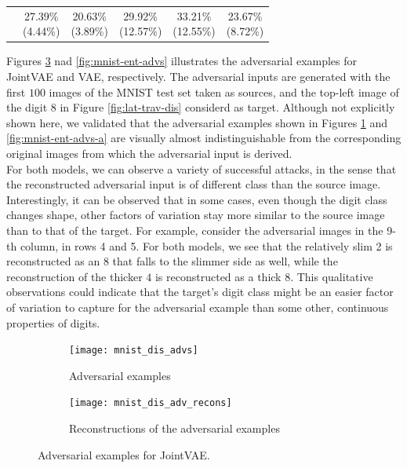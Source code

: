 \documentclass{report}
\begin{document}
\begin{center}
{\begin{tabular}{c|c|c|c|c|c|}
  & \makecell{27.39\% \\ (4.44\%)} & \makecell{20.63\% \\ (3.89\%)} & \makecell{29.92\% \\ (12.57\%)} & \makecell{33.21\% \\ (12.55\%)} & \makecell{23.67\% \\ (8.72\%)} \\ \cline{2-6}
  \end{tabular}
}
\label{tab:adv-atck-target-marg}
\end{center}

\noindent Figures \ref{fig:mnist-dis-advs} nad \ref{fig:mnist-ent-advs} illustrates the adversarial examples for JointVAE and VAE, respectively. The adversarial inputs are generated with the first $100$ images of the MNIST test set taken as sources, and the top-left image of the digit $8$ in Figure \ref{fig:lat-trav-dis} considerd as target. Although not explicitly shown here, we validated that the adversarial examples shown in Figures \ref{fig:mnist-dis-advs-a} and \ref{fig:mnist-ent-advs-a} are visually almost indistinguishable from the corresponding original images from which the adversarial input is derived. \\

\noindent For both models, we can observe a variety of successful attacks, in the sense that the reconstructed adversarial input is of different class than the source image. Interestingly, it can be observed that in some cases, even though the digit class changes shape, other factors of variation stay more similar to the source image than to that of the target. For example, consider the adversarial images in the 9-th column, in rows 4 and 5. For both models, we see that the relatively slim 2 is reconstructed as an $8$ that falls to the slimmer side as well, while the reconstruction of the thicker $4$ is reconstructed as a thick $8$. This qualitative observations could indicate that the target's digit class might be an easier factor of variation to capture for the adversarial example than some other, continuous properties of digits. \\

\begin{figure}
\begin{subfigure}{.5\textwidth}
  \centering
  \texttt{[image: mnist\_dis\_advs]}
  \caption{Adversarial examples}
  \label{fig:mnist-dis-advs-a}
\end{subfigure}%
\begin{subfigure}{.5\textwidth}
  \centering
  \texttt{[image: mnist\_dis\_adv\_recons]}
  \caption{Reconstructions of the adversarial examples}
  \label{fig:mnist-dis-advs-b}
\end{subfigure}
\caption{Adversarial examples for JointVAE.}
\label{fig:mnist-dis-advs}
\end{figure}
\end{document}
